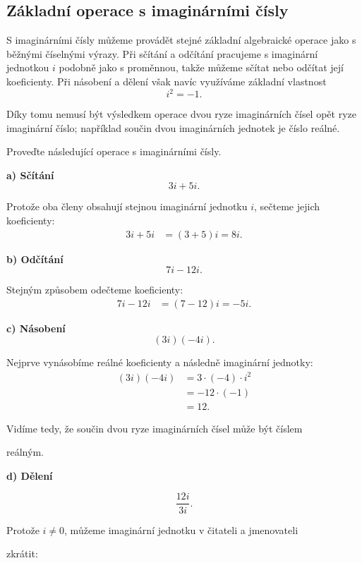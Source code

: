 \documentclass[12pt,a4paper]{article}
\begin{document}
\subsection{Základní operace s imaginárními čísly}
S imaginárními čísly můžeme provádět stejné základní algebraické operace jako
s běžnými číselnými výrazy. Při sčítání a odčítání pracujeme s imaginární
jednotkou $i$ podobně jako s proměnnou, takže můžeme sčítat nebo odčítat její
koeficienty. Při násobení a dělení však navíc využíváme základní vlastnost
\[
    i^2=-1.
\]

Díky tomu nemusí být výsledkem operace dvou ryze imaginárních čísel opět ryze imaginární číslo;
například součin dvou imaginárních jednotek je číslo reálné.

\begin{examplebox}
    Proveďte následující operace s imaginárními čísly.

    \textbf{a) Sčítání}
    \[
        3i+5i.
    \]

    Protože oba členy obsahují stejnou imaginární jednotku $i$, sečteme jejich koeficienty:
    \begin{align*}
        3i+5i
        &= (3+5)i = 8i.
    \end{align*}

    \textbf{b) Odčítání}
    \[
        7i-12i.
    \]

    Stejným způsobem odečteme koeficienty:
    \begin{align*}
        7i-12i
        &= (7-12)i = -5i.
    \end{align*}

    \textbf{c) Násobení}
    \[
        (3i)(-4i).
    \]

    Nejprve vynásobíme reálné koeficienty a následně imaginární jednotky:
    \begin{align*}
        (3i)(-4i)
        &= 3\cdot(-4)\cdot i^2 \\
        &= -12\cdot(-1) \\
        &= 12.
    \end{align*}

    Vidíme tedy, že součin dvou ryze imaginárních čísel může být číslem

    reálným.

    \textbf{d) Dělení}

    \[
        \frac{12i}{3i}.
    \]

    Protože $i\neq0$, můžeme imaginární jednotku v čitateli a jmenovateli

    zkrátit:


\end{examplebox}
\end{document}
